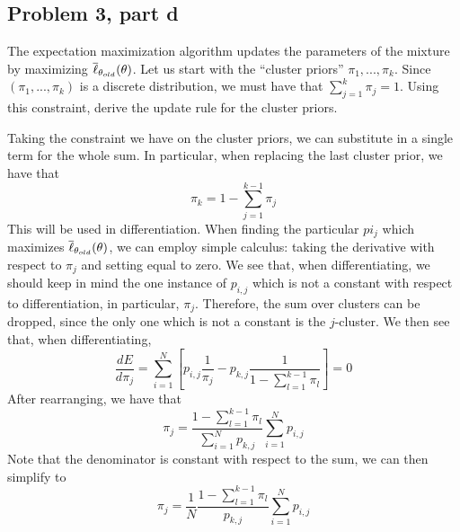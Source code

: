 \subsection{Problem 3, part d}
The expectation maximization algorithm updates the parameters of the mixture by maximizing $\overline{\ell}_{\theta_{old}}(\theta)$. Let us start with the ``cluster priors'' $\pi_1, ..., \pi_k.$ Since $(\pi_1, ..., \pi_k)$ is a discrete distribution, we must have that $\sum_{j = 1}^k \pi_j = 1$. Using this constraint, derive the update rule for the cluster priors. 
\partbreak
\begin{solution}

    Taking the constraint we have on the cluster priors, we can substitute in a single term for the whole sum. In particular, when replacing the last cluster prior, we have that 
    \[\pi_k = 1 - \sum_{j = 1}^{k-1} \pi_j\]
    This will be used in differentiation. When finding the particular $pi_j$ which maximizes $\overline{\ell}_{\theta_{old}}(\theta)$, we can employ simple calculus: taking the derivative with respect to $\pi_j$ and setting equal to zero. We see that, when differentiating, we should keep in mind the one instance of $p_{i, j}$ which is not a constant with respect to differentiation, in particular, $\pi_j$. Therefore, the sum over clusters can be dropped, since the only one which is not a constant is the $j$-cluster. We then see that, when differentiating, 
    \[\frac{d E}{d\pi_j} = \sum_{i = 1}^N \left[p_{i, j}\frac{1}{\pi_j} - p_{k, j}\frac{1}{1 - \sum_{l = 1}^{k-1} \pi_l}\right] = 0\]
    After rearranging, we have that
    \[\pi_j = \frac{1 - \sum_{l = 1}^{k-1}\pi_l}{\sum_{i = 1}^N p_{k, j}}\sum_{i = 1}^N p_{i, j}\]
    Note that the denominator is constant with respect to the sum, we can then simplify to
    \[\pi_j = \frac{1}{N}\frac{1 - \sum_{l = 1}^{k-1}\pi_l}{p_{k, j}}\sum_{i = 1}^N p_{i, j}\]
\end{solution}
